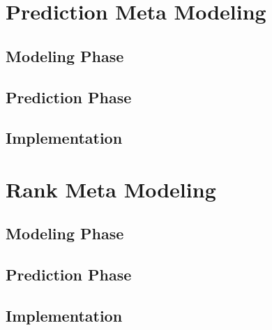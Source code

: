 \section{Prediction Meta Modeling}

\subsection{Modeling Phase}

\subsection{Prediction Phase}

\subsection{Implementation}



\section{Rank Meta Modeling}
\label{sec:methods:rank}

\subsection{Modeling Phase}

\subsection{Prediction Phase}

\subsection{Implementation}


